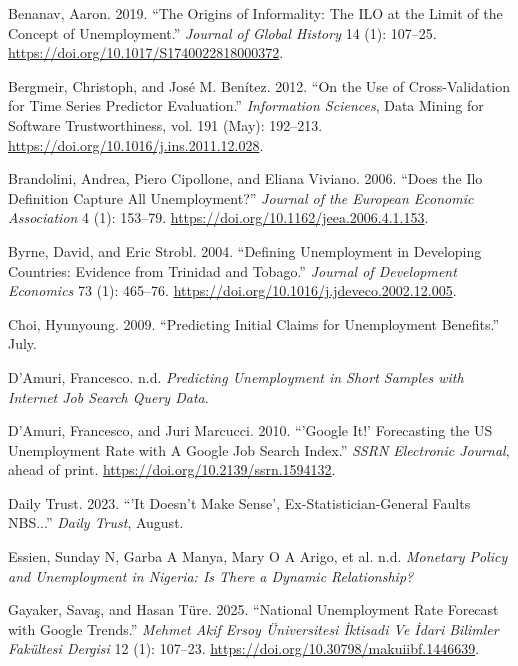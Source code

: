 \documentclass[
  letterpaper,
  DIV=11,
  numbers=noendperiod]{scrartcl}
\newlength{\cslhangindent}
\newenvironment{CSLReferences}[2] %
 {\begin{list}{}{%
  \setlength{\itemindent}{0pt}
  \setlength{\leftmargin}{0pt}
  \setlength{\parsep}{0pt}
  \ifodd #1
   \setlength{\leftmargin}{\cslhangindent}
   \setlength{\itemindent}{-1\cslhangindent}
  \fi
  \setlength{\itemsep}{#2\baselineskip}}}
 {\end{list}}
\begin{document}
\begin{CSLReferences}{1}{1}
Benanav, Aaron. 2019. {``The Origins of Informality: The {ILO} at the
Limit of the Concept of Unemployment.''} \emph{Journal of Global
History} 14 (1): 107--25.
\url{https://doi.org/10.1017/S1740022818000372}.

Bergmeir, Christoph, and José M. Benítez. 2012. {``On the Use of
Cross-Validation for Time Series Predictor Evaluation.''}
\emph{Information Sciences}, Data {Mining} for {Software
Trustworthiness}, vol. 191 (May): 192--213.
\url{https://doi.org/10.1016/j.ins.2011.12.028}.

Brandolini, Andrea, Piero Cipollone, and Eliana Viviano. 2006. {``Does
the {Ilo Definition Capture All Unemployment}?''} \emph{Journal of the
European Economic Association} 4 (1): 153--79.
\url{https://doi.org/10.1162/jeea.2006.4.1.153}.

Byrne, David, and Eric Strobl. 2004. {``Defining Unemployment in
Developing Countries: Evidence from {Trinidad} and {Tobago}.''}
\emph{Journal of Development Economics} 73 (1): 465--76.
\url{https://doi.org/10.1016/j.jdeveco.2002.12.005}.

Choi, Hyunyoung. 2009. {``Predicting {Initial Claims} for {Unemployment
Benefits}.''} July.

D'Amuri, Francesco. n.d. \emph{Predicting Unemployment in Short Samples
with Internet Job Search Query Data}.

D'Amuri, Francesco, and Juri Marcucci. 2010. {``'{Google It}!'
{Forecasting} the {US Unemployment Rate} with {A Google Job Search
Index}.''} \emph{SSRN Electronic Journal}, ahead of print.
\url{https://doi.org/10.2139/ssrn.1594132}.

Daily Trust. 2023. {``'{It} Doesn't Make Sense',
Ex-{Statistician-General} Faults {NBS}...''} \emph{Daily Trust}, August.

Essien, Sunday N, Garba A Manya, Mary O A Arigo, et al. n.d.
\emph{Monetary Policy and Unemployment in {Nigeria}: {Is} There a
Dynamic Relationship?}

Gayaker, Savaş, and Hasan Türe. 2025. {``National {Unemployment Rate
Forecast} with {Google Trends}.''} \emph{Mehmet Akif Ersoy Üniversitesi
İktisadi Ve İdari Bilimler Fakültesi Dergisi} 12 (1): 107--23.
\url{https://doi.org/10.30798/makuiibf.1446639}.


\end{CSLReferences}
\end{document}
